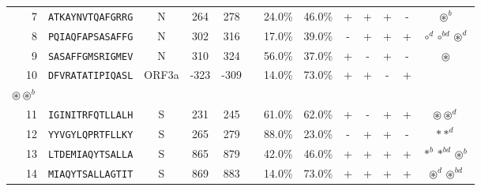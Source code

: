 \begin{tabular}{rcccccccccccc}
7  &  \texttt{ATKAYNVTQAFGRRG} &       N &    264 &   278 &                &                          24.0\% &                           46.0\% &          + &           + &          + &           - &                                                                                                       $ \circledast^b $ \\
8  &  \texttt{PQIAQFAPSASAFFG} &       N &    302 &   316 &                &                          17.0\% &                           39.0\% &          - &           + &          + &           + &                                                                                    $ \circ^d \circ^{bd} \circledast^d $ \\
9  &  \texttt{SASAFFGMSRIGMEV} &       N &    310 &   324 &                &                          56.0\% &                           37.0\% &          + &           - &          + &           - &                                                                                                         $ \circledast $ \\
10 &  \texttt{DFVRATATIPIQASL} &   ORF3a &   -323 &  -309 &                &                          14.0\% &                           73.0\% &          + &           + &          - &           + &                                     \Centerstack{  $\circ \circ^b \circ^d \circ^{bd}$ \\  $\circledast \circledast^b$ } \\
11 &  \texttt{IGINITRFQTLLALH} &       S &    231 &   245 &                &                          61.0\% &                           62.0\% &          + &           - &          + &           + &                                                                                           $ \circledast \circledast^d $ \\
12 &  \texttt{YYVGYLQPRTFLLKY} &       S &    265 &   279 &                &                          88.0\% &                           23.0\% &          - &           + &          + &           - &                                                                                                         $ \ast \ast^d $ \\
13 &  \texttt{LTDEMIAQYTSALLA} &       S &    865 &   879 &                &                          42.0\% &                           46.0\% &          + &           + &          + &           + &                                                                                      $ \ast^b \ast^{bd} \circledast^b $ \\
14 &  \texttt{MIAQYTSALLAGTIT} &       S &    869 &   883 &                &                          14.0\% &                           73.0\% &          + &           + &          + &           + &                                                                                      $ \circledast^d \circledast^{bd} $ \\

\end{tabular}
